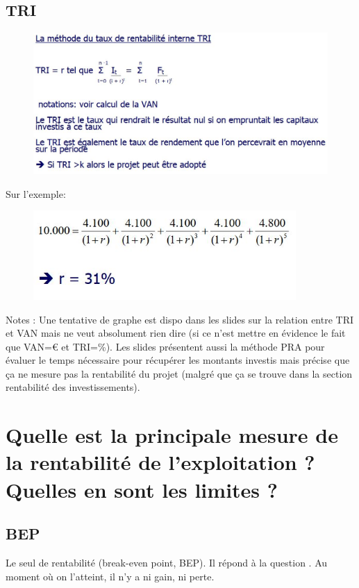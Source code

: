 \documentclass{article}
\begin{document}
\subsection{TRI}

\begin{figure}[H]
	\centering
	\includegraphics[width=14cm]{tri.jpg}
\end{figure}

Sur l'exemple:

\begin{figure}[H]
	\includegraphics[width=10cm]{tri-exemple.jpg}
\end{figure}

Notes : 
Une tentative de graphe est dispo dans les slides sur la relation entre TRI et VAN mais ne veut absolument rien dire (si ce n'est mettre en évidence le fait que VAN=\euro{} et TRI=\%).
Les slides présentent aussi la méthode PRA pour évaluer le temps nécessaire pour récupérer les montants investis mais précise que ça ne mesure pas la rentabilité du projet (malgré que ça se trouve dans la section rentabilité des investissements).

\section{Quelle est la principale mesure de la rentabilité de l’exploitation ? Quelles en sont les limites ?}

\subsection{BEP}
Le seul de rentabilité (break-even point, BEP). Il répond à la question . Au moment où on l'atteint, il n'y a ni gain, ni perte.
\end{document}
